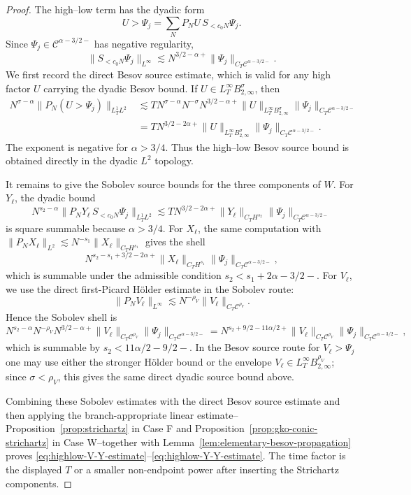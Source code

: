\documentclass[10pt]{amsart}
\numberwithin{equation}{section}
\theoremstyle{plain}
\theoremstyle{definition}
\theoremstyle{remark}
\newcommand{\C}{\mathcal{C}}
\begin{document}
\begin{proof}
The high--low term has the dyadic form
\[
        U>\Psi_j=\sum_N P_NU\,S_{<c_0N}\Psi_j.
\]
Since \(\Psi_j\in\C^{\alpha-3/2-}\) has negative regularity,
\[
        \|S_{<c_0N}\Psi_j\|_{L^\infty}
        \lesssim N^{3/2-\alpha+}\|\Psi_j\|_{C_T\C^{\alpha-3/2-}}.
\]
We first record the direct Besov source estimate, which is valid for any high factor \(U\) carrying the dyadic Besov bound.  If \(U\in L_T^\infty B_{2,\infty}^{\sigma}\), then
\[
\begin{aligned}
        N^{\sigma-\alpha}
        \|P_N(U>\Psi_j)\|_{L_T^1L^2}
        &\lesssim T N^{\sigma-\alpha}N^{-\sigma}N^{3/2-\alpha+}
        \|U\|_{L_T^\infty B_{2,\infty}^{\sigma}}
        \|\Psi_j\|_{C_T\C^{\alpha-3/2-}}  \\
        &=T N^{3/2-2\alpha+}
        \|U\|_{L_T^\infty B_{2,\infty}^{\sigma}}
        \|\Psi_j\|_{C_T\C^{\alpha-3/2-}}.
\end{aligned}
\]
The exponent is negative for \(\alpha>3/4\).  Thus the high--low Besov source bound is obtained directly in the dyadic \(L^2\) topology.

It remains to give the Sobolev source bounds for the three components of \(W\).  For \(Y_\ell\), the dyadic bound
\[
        N^{s_2-\alpha}
        \|P_NY_\ell\,S_{<c_0N}\Psi_j\|_{L_T^1L^2}
        \lesssim T N^{3/2-2\alpha+}
        \|Y_\ell\|_{C_TH^{s_2}}
        \|\Psi_j\|_{C_T\C^{\alpha-3/2-}}
\]
is square summable because \(\alpha>3/4\).  For \(X_\ell\), the same computation with \(\|P_NX_\ell\|_{L^2}\lesssim N^{-s_1}\|X_\ell\|_{C_TH^{s_1}}\) gives the shell
\[
        N^{s_2-s_1+3/2-2\alpha+}
        \|X_\ell\|_{C_TH^{s_1}}
        \|\Psi_j\|_{C_T\C^{\alpha-3/2-}},
\]
which is summable under the admissible condition \(s_2<s_1+2\alpha-3/2-\).  For \(V_\ell\), we use the direct first-Picard H\"older estimate in the Sobolev route:
\[
        \|P_NV_\ell\|_{L^\infty}\lesssim N^{-\rho_V}\|V_\ell\|_{C_T\C^{\rho_V}}.
\]
Hence the Sobolev shell is
\[
        N^{s_2-\alpha}N^{-\rho_V}N^{3/2-\alpha+}
        \|V_\ell\|_{C_T\C^{\rho_V}}
        \|\Psi_j\|_{C_T\C^{\alpha-3/2-}}
        =N^{s_2+9/2-11\alpha/2+}
        \|V_\ell\|_{C_T\C^{\rho_V}}
        \|\Psi_j\|_{C_T\C^{\alpha-3/2-}},
\]
which is summable by \(s_2<11\alpha/2-9/2-\).  In the Besov source route for \(V_\ell>\Psi_j\) one may use either the stronger H\"older bound or the envelope \(V_\ell\in L_T^\infty B_{2,\infty}^{\rho_V}\); since \(\sigma<\rho_V\), this gives the same direct dyadic source bound above.

Combining these Sobolev estimates with the direct Besov source estimate and then applying the branch-appropriate linear estimate--Proposition~\ref{prop:strichartz} in Case F and Proposition~\ref{prop:gko-conic-strichartz} in Case W--together with Lemma~\ref{lem:elementary-besov-propagation} proves \eqref{eq:highlow-V-Y-estimate}--\eqref{eq:highlow-Y-Y-estimate}.  The time factor is the displayed \(T\) or a smaller non-endpoint power after inserting the Strichartz components.


\end{proof}
\end{document}
